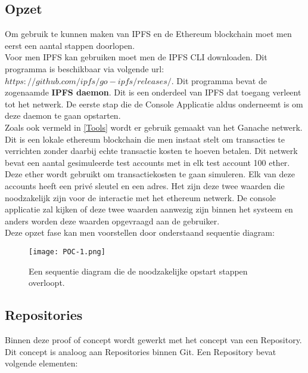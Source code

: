 \subsection{Opzet}
Om gebruik te kunnen maken van IPFS en de Ethereum blockchain moet men eerst een aantal stappen doorlopen.\\

Voor men IPFS kan gebruiken moet men de IPFS CLI downloaden. Dit programma is beschikbaar via volgende url: $https://github.com/ipfs/go-ipfs/releases/$. Dit programma bevat de zogenaamde \textbf{IPFS daemon}. Dit is een onderdeel van IPFS dat toegang verleent tot het netwerk. De eerste stap die de Console Applicatie aldus onderneemt is om deze daemon te gaan opstarten.\\

Zoals ook vermeld in \ref{Tools} wordt er gebruik gemaakt van het Ganache netwerk. Dit is een lokale ethereum blockchain die men instaat stelt om transacties te verrichten zonder daarbij echte transactie kosten te hoeven betalen. Dit netwerk bevat een aantal gesimuleerde test accounts met in elk test account 100 ether. Deze ether wordt gebruikt om transactiekosten te gaan simuleren. Elk van deze accounts heeft een privé sleutel en een adres. Het zijn deze twee waarden die noodzakelijk zijn voor de interactie met het ethereum netwerk. De console applicatie zal kijken of deze twee waarden aanwezig zijn binnen het systeem en anders worden deze waarden opgevraagd aan de gebruiker.\\

Deze opzet fase kan men voorstellen door onderstaand sequentie diagram:

\begin{figure}[h!]
\centering
\texttt{[image: POC-1.png]}
\caption[POC opstart]{Een sequentie diagram die de noodzakelijke opstart stappen overloopt. }
\end{figure}

\subsection{Repositories}
Binnen deze proof of concept wordt gewerkt met het concept van een Repository. Dit concept is analoog aan Repositories binnen Git. Een Repository bevat volgende elementen:

